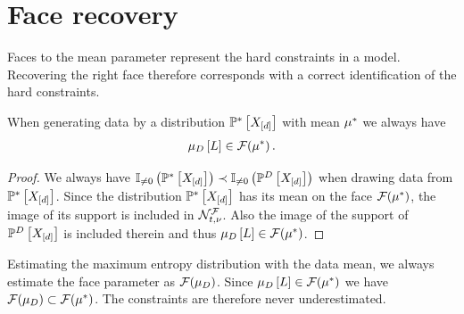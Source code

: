 \section{Face recovery}

Faces to the mean parameter represent the hard constraints in a model.
Recovering the right face therefore corresponds with a correct identification of the hard constraints.

\begin{lemma}
    When generating data by a distribution $\mathbb{P}^*\left[X_{[d]}\right]$ with mean $\mu^*$ we always have
    \begin{align*}
        \mu_{D}\left[L\right] \in \mathcal{F}(\mu^*) \, .
    \end{align*}
\end{lemma}
\begin{proof}
    We always have $\mathbb{I}_{\neq0}\left(\mathbb{P}^*\left[X_{[d]}\right]\right)\prec \mathbb{I}_{\neq0}\left(\mathbb{P}^{D}\left[X_{[d]}\right]\right)$ when drawing data from $\mathbb{P}^*\left[X_{[d]}\right]$.
    Since the distribution $\mathbb{P}^*\left[X_{[d]}\right]$ has its mean on the face $\mathcal{F}(\mu^*)$, the image of its support is included in $\mathcal{N}_{t,\nu}^{\mathcal{F}}$. %
    Also the image of the support of $\mathbb{P}^{D}\left[X_{[d]}\right]$ is included therein and thus $\mu_{D}\left[L\right] \in \mathcal{F}(\mu^*)$. %
\end{proof}

Estimating the maximum entropy distribution with the data mean, we always estimate the face parameter as $\mathcal{F}(\mu_{D})$.
Since $\mu_{D}\left[L\right] \in \mathcal{F}(\mu^*)$ we have $\mathcal{F}(\mu_{D})\subset\mathcal{F}(\mu^*)$.
The constraints are therefore never underestimated.



